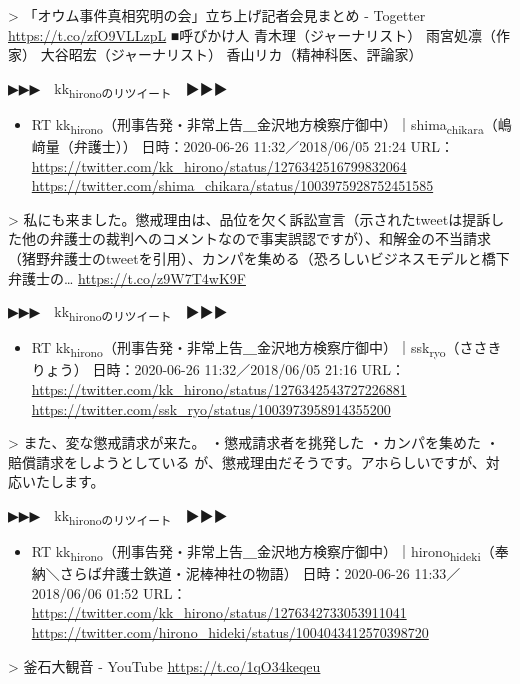 \documentclass[]{ltjarticle}
\begin{document}
> 「オウム事件真相究明の会」立ち上げ記者会見まとめ - Togetter \url{https://t.co/zfO9VLLzpL} ■呼びかけ人 青木理（ジャーナリスト） 雨宮処凛（作家） 大谷昭宏（ジャーナリスト） 香山リカ（精神科医、評論家）  

▶▶▶　kk\textsubscript{hironoのリツイート}　▶▶▶  

\begin{itemize}
\item RT kk\textsubscript{hirono}（刑事告発・非常上告＿金沢地方検察庁御中）｜shima\textsubscript{chikara}（嶋﨑量（弁護士）） 日時：2020-06-26 11:32／2018/06/05 21:24 URL： \url{https://twitter.com/kk\_hirono/status/1276342516799832064} \url{https://twitter.com/shima\_chikara/status/1003975928752451585}
\end{itemize}

> 私にも来ました。懲戒理由は、品位を欠く訴訟宣言（示されたtweetは提訴した他の弁護士の裁判へのコメントなので事実誤認ですが）、和解金の不当請求（猪野弁護士のtweetを引用）、カンパを集める（恐ろしいビジネスモデルと橋下弁護士の… \url{https://t.co/z9W7T4wK9F}  

▶▶▶　kk\textsubscript{hironoのリツイート}　▶▶▶  

\begin{itemize}
\item RT kk\textsubscript{hirono}（刑事告発・非常上告＿金沢地方検察庁御中）｜ssk\textsubscript{ryo}（ささきりょう） 日時：2020-06-26 11:32／2018/06/05 21:16 URL： \url{https://twitter.com/kk\_hirono/status/1276342543727226881} \url{https://twitter.com/ssk\_ryo/status/1003973958914355200}
\end{itemize}

> また、変な懲戒請求が来た。 ・懲戒請求者を挑発した ・カンパを集めた ・賠償請求をしようとしている が、懲戒理由だそうです。アホらしいですが、対応いたします。  

▶▶▶　kk\textsubscript{hironoのリツイート}　▶▶▶  

\begin{itemize}
\item RT kk\textsubscript{hirono}（刑事告発・非常上告＿金沢地方検察庁御中）｜hirono\textsubscript{hideki}（奉納＼さらば弁護士鉄道・泥棒神社の物語） 日時：2020-06-26 11:33／2018/06/06 01:52 URL： \url{https://twitter.com/kk\_hirono/status/1276342733053911041} \url{https://twitter.com/hirono\_hideki/status/1004043412570398720}
\end{itemize}

> 釜石大観音 - YouTube \url{https://t.co/1qO34keqeu}  
\end{document}
